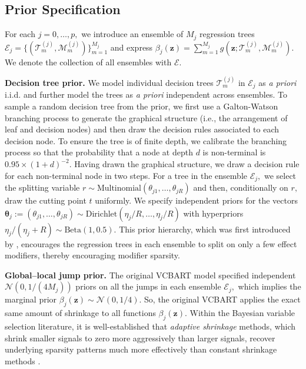 \documentclass[11pt]{article}
\newcommand{\calE}{\mathcal{E}}
\newcommand{\calM}{\mathcal{M}}
\newcommand{\calT}{\mathcal{T}}
\newcommand{\bcalE}{\boldsymbol{\mathcal{E}}}
\newcommand{\normaldist}[2]{\mathcal{N}\left(#1,#2\right)} %
\newcommand{\betadist}[2]{\textrm{Beta}\left(#1,#2\right)} %
\newcommand{\bz}{\bm{z}}
\newcommand{\btheta}{\boldsymbol{\theta}}
\theoremstyle{plain}
\theoremstyle{definition}
\theoremstyle{plain}
\begin{document}

\subsection{Prior Specification}
\label{sec:prior}
For each $j = 0, \ldots, p,$ we introduce an ensemble of $M_{j}$ regression trees $\calE_{j} = \{(\calT^{(j)}_{m}, \calM^{(j)}_{m})\}_{m = 1}^{M_{j}}$ and express 
$\beta_{j}(\bz) = \sum_{m = 1}^{M_{j}}{g(\bz; \calT_{m}^{(j)}, \calM_{m}^{(j)})}.$
We denote the collection of all ensembles with $\bcalE.$

\textbf{Decision tree prior.} We model individual decision trees $\calT_{m}^{(j)}$ in $\calE_{j}$ as \textit{a priori} i.i.d. and further model the trees as \textit{a priori} independent across ensembles.
To sample a random decision tree from the prior, we first use a Galton-Watson branching process to generate the graphical structure (i.e., the arrangement of leaf and decision nodes) and then draw the decision rules associated to each decision node.
To ensure the tree is of finite depth, we calibrate the branching process so that the probability that a node at depth $d$ is non-terminal is $0.95\times(1+d)^{-2}.$
Having drawn the graphical structure, we draw a decision rule for each non-terminal node in two steps.
For a tree in the ensemble $\calE_{j},$ we select the splitting variable $r \sim \textrm{Multinomial}(\theta_{j1}, \ldots, \theta_{jR})$ and then, conditionally on $r,$ draw the cutting point $t$ uniformly.
We specify independent priors for the vectors $\btheta_{j} := (\theta_{j1}, \ldots, \theta_{jR}) \sim \textrm{Dirichlet}(\eta_{j}/R, \ldots, \eta_{j}/R)$ with hyperpriors $\eta_{j}/(\eta_{j} + R) \sim \betadist{1}{0.5}$.
This prior hierarchy, which was first introduced by \citet{Linero2018}, encourages the regression trees in each ensemble to split on only a few effect modifiers, thereby encouraging modifier sparsity. 

\textbf{Global--local jump prior.}
The original VCBART model specified independent $\normaldist{0}{1/(4M_{j})}$ priors on all the jumps in each ensemble $\calE_{j},$ which implies the marginal prior $\beta_{j}(\bz) \sim \normaldist{0}{1/4}.$
So, the original VCBART applies the exact same amount of shrinkage to all functions $\beta_{j}(\bz).$
Within the Bayesian variable selection literature, it is well-established that \emph{adaptive shrinkage} methods, which shrink smaller signals to zero more aggressively than larger signals, recover underlying sparsity patterns much more effectively than constant shrinkage methods \citep{Polson2012, bhadra2016gl,GeorgeRockova2020_penalty_mixing}. 
\end{document}
